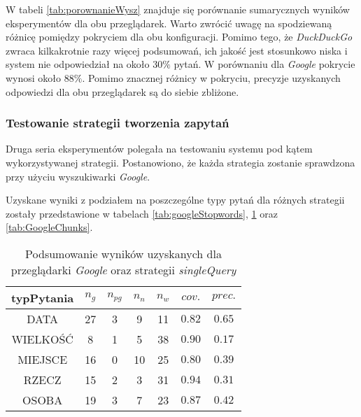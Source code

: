 W tabeli \ref{tab:porownanieWysz} znajduje się porównanie sumarycznych wyników eksperymentów dla obu przeglądarek. Warto zwrócić uwagę na spodziewaną różnicę pomiędzy pokryciem dla obu konfiguracji. Pomimo tego, że \textit{DuckDuckGo} zwraca kilkakrotnie razy więcej podsumowań, ich jakość jest stosunkowo niska i system nie odpowiedział na około $30\%$ pytań. W porównaniu dla \textit{Google} pokrycie wynosi około $88\%$. Pomimo znacznej różnicy w pokryciu, precyzje uzyskanych odpowiedzi dla obu przeglądarek są do siebie zbliżone.

\subsubsection{Testowanie strategii tworzenia zapytań}
Druga seria eksperymentów polegała na testowaniu systemu pod kątem wykorzystywanej strategii. Postanowiono, że każda strategia zostanie sprawdzona przy użyciu wyszukiwarki \textit{Google}. 

Uzyskane wyniki z podziałem na poszczególne typy pytań dla różnych strategii zostały przedstawione w tabelach \ref{tab:googleStopwords}, \ref{tab:GoogleSingle} oraz \ref{tab:GoogleChunks}.


\begin{table}[h]
	\centering
	\begin{tabular}{|c|c|c|c|c|c|c| }
		
		\hline
		\textbf{typPytania} & $n_g$ &$n_{pg}$&$n_n$&$n_w$&$cov.$&$prec.$  \\ \hline
		DATA&27&3&9&11&$\num{0.82}$&$\num{0.65}$ \\ \hline
		WIELKOŚĆ&8&1&5&38&$\num{0.90}$&$\num{0.17}$ \\ \hline
		MIEJSCE&16&0&10&25&$\num{0.80}$&$\num{0.39}$ \\ \hline
		RZECZ&15&2&3&31&$\num{0.94}$&$\num{0.31}$\\ \hline
		OSOBA&19&3&7&23&$\num{0.87}$&$\num{0.42}$\\ \hline
	\end{tabular}
	\caption{Podsumowanie wyników uzyskanych dla przeglądarki \textit{Google} oraz strategii \textit{singleQuery}}
	
	\label{tab:GoogleSingle}
	
\end{table}

